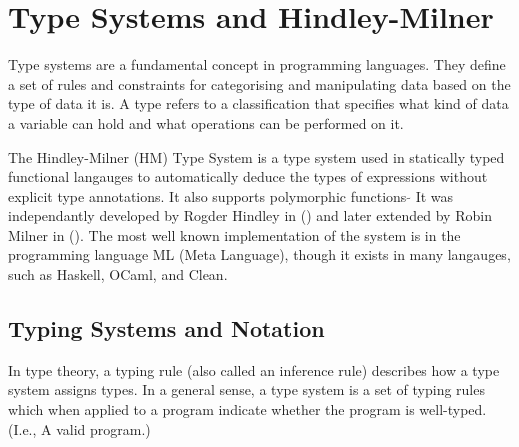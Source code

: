 \documentclass{l4proj}
\begin{document}
\section{Type Systems and Hindley-Milner}



Type systems are a fundamental concept in programming languages.
They define a set of rules and constraints for categorising and manipulating data based on the type of data it is.
A type refers to a classification that specifies what kind of data a variable can hold and what operations can be performed on it.


The Hindley-Milner (HM) Type System is a type system used in statically typed functional langauges to automatically deduce the types of expressions without explicit type annotations.
It also supports polymorphic functions 
$\tilde{}$ It was independantly developed by Rogder Hindley in () and later extended by Robin Milner in ().
The most well known implementation of the system is in the programming language ML (Meta Language), though it exists in many langauges, such as Haskell, OCaml, and Clean.

\subsection{Typing Systems and Notation} \label{subsec:typing-systems-and-notation}

In type theory, a typing rule (also called an inference rule) describes how a type system assigns types.
In a general sense, a type system is a set of typing rules which when applied to a program indicate whether the program is well-typed. (I.e., A valid program.)
\end{document}
